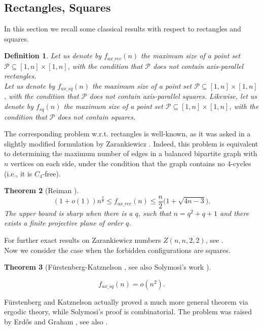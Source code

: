 \documentclass[11pt]{article}
\theoremstyle{plain}
\newtheorem{theorem}{\bf Theorem}[section]
\newtheorem{defi}[theorem]{\bf Definition}
\newcommand\cP{{\mathcal P}}
\begin{document}
	\subsection{Rectangles, Squares}
	
	In this section we recall some classical results with respect to rectangles and squares.
	
	\begin{defi}
		Let us denote by $f_{ax\_rec}(n)$ the maximum size of a point set $\cP\subseteq [1,n]\times [1,n]$, with the condition that $\cP$ does not contain axis-parallel rectangles. \\
		Let us denote by $f_{ax\_sq}(n)$ the maximum size of a point set $\cP\subseteq [1,n]\times [1,n]$, with the condition that $\cP$ does not contain axis-parallel squares. Likewise, let us denote by $f_{sq}(n)$ the maximum size of a point set $\cP\subseteq [1,n]\times [1,n]$, with the condition that $\cP$ does not contain squares.
	\end{defi}
	
	
	
	The corresponding problem w.r.t. rectangles is well-known, as it was asked in a slightly modified formulation by Zarankiewicz \cite{Zara}. Indeed, this problem is equivalent to determining the maximum number of edges in a balanced bipartite graph with $n$ vertices on each side, under the condition that the graph contains no $4$-cycles (i.e., it is $C_4$-free). 
	
	\begin{theorem}[Reiman \cite{Reiman}] {$$(1+o(1))n^{\frac{3}{2}}\le f_{ax\_rec}(n)\le \frac{n}{2}\bigl(1+\sqrt{4n-3}\bigr).$$
			The upper bound is sharp when there is a $q$, such that $n=q^2+q+1$ and there exists a finite projective plane of order $q$.
		}
	\end{theorem}
	\noindent For further exact results on Zarankiewicz numbers $Z(n,n,2,2)$, see \cite{Furedi, FS, KST}.\\
	
	Now we consider the case when the forbidden configurations are squares.
	
	\begin{theorem}[Fürstenberg-Katznelson \cite{FK}, see also Solymosi's work \cite{Solymosi}]\label{Solym}
		
		$$f_{ax\_sq}(n)=o(n^2).$$
	\end{theorem}
	\noindent Fürstenberg and Katznelson actually proved a much more
	general theorem via ergodic theory, while Solymosi's proof is combinatorial. The problem was raised by Erdős and Graham \cite{EG}, see also \cite{ASz}. 
	
\end{document}
